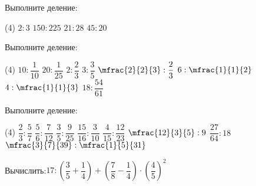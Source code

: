 \begin{class}[number=3]
\begin{listofex}
		\item Выполните деление:
		\begin{tasks}(4)
			\task \( 2:3 \)
			\task \( 150:225 \)
			\task \( 21:28 \)
			\task \( 45:20 \)
		\end{tasks}
		\item Выполните деление:
		\begin{tasks}(4)
			\task \( 10:\dfrac{1}{10} \)
			\task \( 20:\dfrac{1}{25} \)
			\task \( 2:\dfrac{2}{3} \)
			\task \( 3:\dfrac{3}{5} \)
			\task \( \mfrac{2}{2}{3}:\dfrac{2}{3} \)
			\task \( 6:\mfrac{1}{1}{2} \)
			\task \( 4:\mfrac{1}{1}{3} \)
			\task \( 18:\dfrac{54}{61} \)
		\end{tasks}
		\item Выполните деление:
		\begin{tasks}(4)
			\task \( \dfrac{2}{3}:\dfrac{5}{7} \)
			\task \( \dfrac{5}{6}:\dfrac{7}{12} \)
			\task \( \dfrac{3}{5}:\dfrac{9}{25} \)
			\task \( \dfrac{15}{16}:\dfrac{3}{10} \)
			\task \( \dfrac{4}{15}:\dfrac{12}{23} \)
			\task \( \mfrac{12}{3}{5}:9 \)
			\task \( \dfrac{27}{64}:18 \)
			\task \( \mfrac{3}{7}{39}:\mfrac{1}{5}{31} \)
		\end{tasks}
		\item Вычислить:\quad\( 17:\left( \dfrac{3}{5}+\dfrac{1}{4} \right)+\left( \dfrac{7}{8}-\dfrac{1}{4} \right)\cdot\left( \dfrac{4}{5} \right)^2 \)
	\end{listofex}
\end{class}
%
